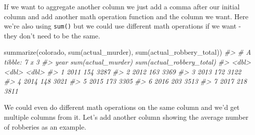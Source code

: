 \documentclass[
]{krantz}
\makeatletter
\newenvironment{Shaded}{\begin{snugshade}}{\end{snugshade}}
\newcommand{\CommentTok}[1]{\textcolor[rgb]{0.37,0.37,0.37}{\textit{#1}}}
\newcommand{\FunctionTok}[1]{\textcolor[rgb]{0,0,0}{#1}}
\newcommand{\NormalTok}[1]{#1}
\newenvironment{kframe}{%
\medskip{}
\setlength{\fboxsep}{.8em}
 \def\at@end@of@kframe{}%
 \ifinner\ifhmode%
  \def\at@end@of@kframe{\end{minipage}}%
  \begin{minipage}{\columnwidth}%
 \fi\fi%
 \def\FrameCommand##1{\hskip\@totalleftmargin \hskip-\fboxsep
 \colorbox{shadecolor}{##1}\hskip-\fboxsep
     \hskip-\linewidth \hskip-\@totalleftmargin \hskip\columnwidth}%
 \MakeFramed {\advance\hsize-\width
   \@totalleftmargin\z@ \linewidth\hsize
   \@setminipage}}%
 {\par\unskip\endMakeFramed%
 \at@end@of@kframe}
\renewenvironment{Shaded}{\begin{kframe}}{\end{kframe}}
\makeatother
\begin{document}
If we want to aggregate another column we just add a comma after our initial column and add another math operation function and the column we want. Here we're also using \texttt{sum()} but we could use different math operations if we want - they don't need to be the same.

\begin{Shaded}
\begin{Highlighting}[]
\FunctionTok{summarize}\NormalTok{(colorado, }\FunctionTok{sum}\NormalTok{(actual\_murder), }
          \FunctionTok{sum}\NormalTok{(actual\_robbery\_total))}
\CommentTok{\#\textgreater{} \# A tibble: 7 x 3}
\CommentTok{\#\textgreater{}    year \textasciigrave{}sum(actual\_murder)\textasciigrave{} \textasciigrave{}sum(actual\_robbery\_total)\textasciigrave{}}
\CommentTok{\#\textgreater{}   \textless{}dbl\textgreater{}                \textless{}dbl\textgreater{}                       \textless{}dbl\textgreater{}}
\CommentTok{\#\textgreater{} 1  2011                  154                        3287}
\CommentTok{\#\textgreater{} 2  2012                  163                        3369}
\CommentTok{\#\textgreater{} 3  2013                  172                        3122}
\CommentTok{\#\textgreater{} 4  2014                  148                        3021}
\CommentTok{\#\textgreater{} 5  2015                  173                        3305}
\CommentTok{\#\textgreater{} 6  2016                  203                        3513}
\CommentTok{\#\textgreater{} 7  2017                  218                        3811}
\end{Highlighting}
\end{Shaded}

We could even do different math operations on the same column and we'd get multiple columns from it. Let's add another column showing the average number of robberies as an example.
\end{document}

